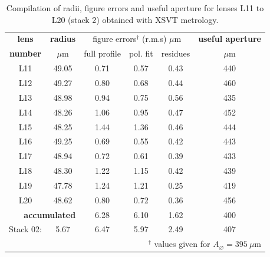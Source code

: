 \begin{refsection}
\begin{table}[t]
\caption[Lens stack 2 main parameters from XSVT metrology.]{Compilation of radii, figure errors and useful aperture for lenses L11 to L20 (stack 2) obtained with XSVT metrology.}
\centering
\label{tab:CDo}
\begin{tabular}{cccccc}
\textbf{lens}      & \textbf{radius}  & \multicolumn{3}{c}{figure errors$^\dagger$ (r.m.s) $\mu$m}   & \textbf{useful aperture}\\ \cline{3-5}  
\textbf{number}    & $\mu$m           & full profile & pol. fit   & residues                                         & $\mu$m\\ \hline \hline
L11                &49.05   &0.71   &0.57   &0.43      &440\\
L12                &49.27   &0.80   &0.68   &0.44      &460\\
L13                &48.98   &0.94   &0.75   &0.56      &435\\
L14                &48.26   &1.06   &0.95   &0.47      &452\\
L15                &48.25   &1.44   &1.36   &0.46      &444\\
L16                &49.25   &0.69   &0.55   &0.42      &443\\
L17                &48.94   &0.72   &0.61   &0.39      &433\\
L18                &48.30   &1.22   &1.15   &0.42      &439\\
L19                &47.78   &1.24   &1.21   &0.25      &419\\
L20                &48.62   &0.80   &0.72   &0.36      &456\\
\hline
\multicolumn{2}{r}{\textbf{accumulated}}      &6.28    & 6.10  &1.62 &400\\
\hline
Stack 02:           &5.67    &6.47   &5.97   &2.49  &407\\
\hline \hline
\multicolumn{6}{r}{\footnotesize{$^\dagger$ values given for $A_{\diameter}=395~\mu\text{m}$}}       
\end{tabular}
\end{table}


\end{refsection}
